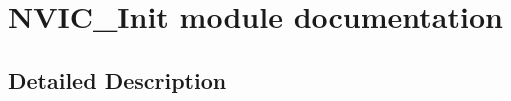 \hypertarget{group___n_v_i_c___init__module}{}\section{N\+V\+I\+C\+\_\+\+Init module documentation}
\label{group___n_v_i_c___init__module}


\subsection{Detailed Description}
